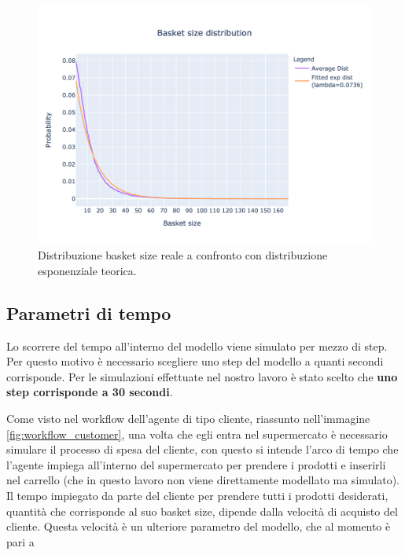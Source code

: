 \begin{figure}[H]
	\centering
 	\includegraphics[width=14cm]{"images/basket_size_fitted.png"}
	\caption{Distribuzione basket size reale a confronto con distribuzione esponenziale teorica.}
	\label{fig:dist_basket_size}
\end{figure}

\subsection{Parametri di tempo}
\label{parameters:time}
Lo scorrere del tempo all'interno del modello viene simulato per mezzo di step. Per questo motivo è necessario scegliere uno step del modello a quanti secondi corrisponde. Per le simulazioni effettuate nel nostro lavoro è stato scelto che \textbf{uno step corrisponde a 30 secondi}.

Come visto nel workflow dell'agente di tipo cliente, riassunto nell'immagine \ref{fig:workflow_customer}, una volta che egli entra nel supermercato è necessario simulare il processo di spesa del cliente, con questo si intende l'arco di tempo che l'agente impiega all'interno del supermercato per prendere i prodotti e inserirli nel carrello (che in questo lavoro non viene direttamente modellato ma simulato). Il tempo impiegato da parte del cliente per prendere tutti i prodotti desiderati, quantità che corrisponde al suo basket size, dipende dalla velocità di acquisto del cliente. Questa velocità è un ulteriore parametro del modello, che al momento è pari a 

